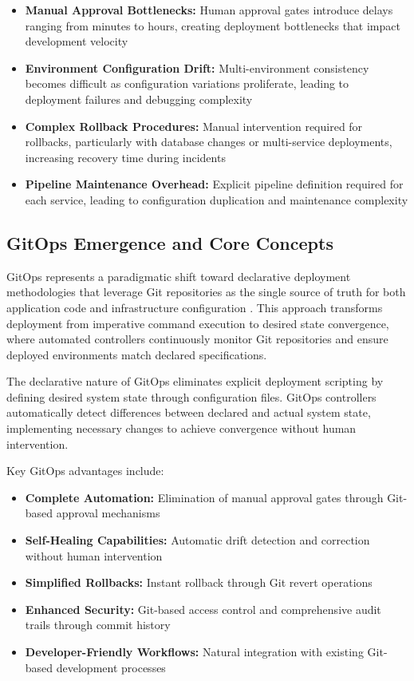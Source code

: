 \begin{itemize}
\item \textbf{Manual Approval Bottlenecks:} Human approval gates introduce delays ranging from minutes to hours, creating deployment bottlenecks that impact development velocity
\item \textbf{Environment Configuration Drift:} Multi-environment consistency becomes difficult as configuration variations proliferate, leading to deployment failures and debugging complexity
\item \textbf{Complex Rollback Procedures:} Manual intervention required for rollbacks, particularly with database changes or multi-service deployments, increasing recovery time during incidents
\item \textbf{Pipeline Maintenance Overhead:} Explicit pipeline definition required for each service, leading to configuration duplication and maintenance complexity
\end{itemize}

\subsection{GitOps Emergence and Core Concepts}

GitOps represents a paradigmatic shift toward declarative deployment methodologies that leverage Git repositories as the single source of truth for both application code and infrastructure configuration \cite{weaveworks2017gitops, beetz2021gitops}. This approach transforms deployment from imperative command execution to desired state convergence, where automated controllers continuously monitor Git repositories and ensure deployed environments match declared specifications.

The declarative nature of GitOps eliminates explicit deployment scripting by defining desired system state through configuration files. GitOps controllers automatically detect differences between declared and actual system state, implementing necessary changes to achieve convergence without human intervention.

Key GitOps advantages include:

\begin{itemize}
\item \textbf{Complete Automation:} Elimination of manual approval gates through Git-based approval mechanisms
\item \textbf{Self-Healing Capabilities:} Automatic drift detection and correction without human intervention
\item \textbf{Simplified Rollbacks:} Instant rollback through Git revert operations
\item \textbf{Enhanced Security:} Git-based access control and comprehensive audit trails through commit history
\item \textbf{Developer-Friendly Workflows:} Natural integration with existing Git-based development processes
\end{itemize}

